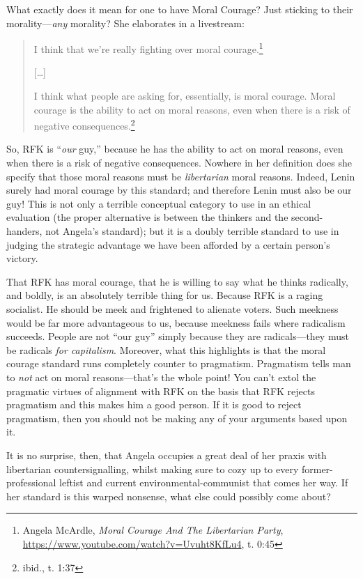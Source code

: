 \documentclass[11pt]{article}
\begin{document}
What exactly does it mean for one to have Moral Courage? Just sticking to their morality---\emph{any} morality? She elaborates in a livestream:
\begin{quote}
I think that we're really fighting over moral courage.\footnote{Angela McArdle, \emph{Moral Courage And The Libertarian Party}, \url{https://www.youtube.com/watch?v=Uvuht8KfLu4}, t. 0:45}

{[}\ldots{}]

I think what people are asking for, essentially, is moral courage. Moral courage is the ability to act on moral reasons, even when there is a risk of negative consequences.\footnote{ibid., t. 1:37}
\end{quote}

So, RFK is ``\emph{our} guy,'' because he has the ability to act on moral reasons, even when there is a risk of negative consequences. Nowhere in her definition does she specify that those moral reasons must be \emph{libertarian} moral reasons. Indeed, Lenin surely had moral courage by this standard; and therefore Lenin must also be our guy! This is not only a terrible conceptual category to use in an ethical evaluation (the proper alternative is between the thinkers and the second-handers, not Angela's standard); but it is a doubly terrible standard to use in judging the strategic advantage we have been afforded by a certain person's victory.

That RFK has moral courage, that he is willing to say what he thinks radically, and boldly, is an absolutely terrible thing for us. Because RFK is a raging socialist. He should be meek and frightened to alienate voters. Such meekness would be far more advantageous to us, because meekness fails where radicalism succeeds. People are not ``our guy'' simply because they are radicals---they must be radicals \emph{for capitalism}. Moreover, what this highlights is that the moral courage standard runs completely counter to pragmatism. Pragmatism tells man to \emph{not} act on moral reasons---that's the whole point! You can't extol the pragmatic virtues of alignment with RFK on the basis that RFK rejects pragmatism and this makes him a good person. If it is good to reject pragmatism, then you should not be making any of your arguments based upon it.

It is no surprise, then, that Angela occupies a great deal of her praxis with libertarian countersignalling, whilst making sure to cozy up to every former-professional leftist and current environmental-communist that comes her way. If her standard is this warped nonsense, what else could possibly come about?
\end{document}
